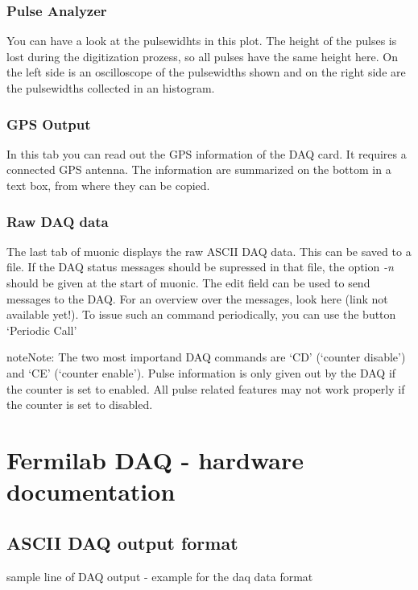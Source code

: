 \documentclass[letterpaper,10pt,english]{sphinxmanual}
\begin{document}
\subsubsection{Pulse Analyzer}
\label{tutorial:pulse-analyzer}
You can have a look at the pulsewidhts in this plot. The height of the pulses is lost during the digitization prozess, so all pulses have the same height here.
On the left side is an oscilloscope of the pulsewidths shown and on the right side are the pulsewidths collected in an histogram.


\subsubsection{GPS Output}
\label{tutorial:gps-output}
In this tab you can read out the GPS information of the DAQ card. It requires a connected GPS antenna. The information are summarized on the bottom in a text box, from where they can be copied.


\subsubsection{Raw DAQ data}
\label{tutorial:raw-daq-data}
The last tab of muonic displays the raw ASCII DAQ data.
This can be saved to a file. If the DAQ status messages should be supressed in that file, the option \emph{-n} should be given at the start of muonic.
The edit field can be used to send messages to the DAQ. For an overview over the messages, look here (link not available yet!).
To issue such an command periodically, you can use the button `Periodic Call'

\begin{notice}{note}{Note:}
The two most importand DAQ commands are `CD' (`counter disable') and `CE' (`counter enable'). Pulse information is only given out by the DAQ if the counter is set to enabled. All pulse related features may not work properly if the counter is set to disabled.
\end{notice}


\section{Fermilab DAQ - hardware documentation}
\label{hardware:fermilab-daq-hardware-documentation}\label{hardware::doc}

\subsection{ASCII DAQ output format}
\label{hardware:ascii-daq-output-format}
sample line of DAQ output - example for the daq data format
\end{document}
